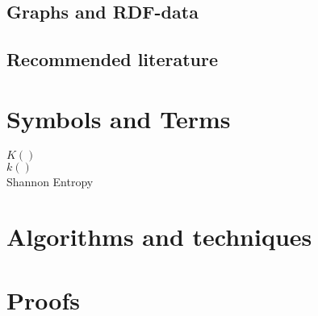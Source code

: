 \documentclass{thesis}
\begin{document}
\section{Graphs and RDF-data}
\section{Recommended literature}

\chapter{Symbols and Terms}

\begin{description}
 \item[$K()$]
 \item[$k()$]
 \item[Shannon Entropy]
\end{description}

\chapter{Algorithms and techniques}
\chapter{Proofs}
\end{document}
